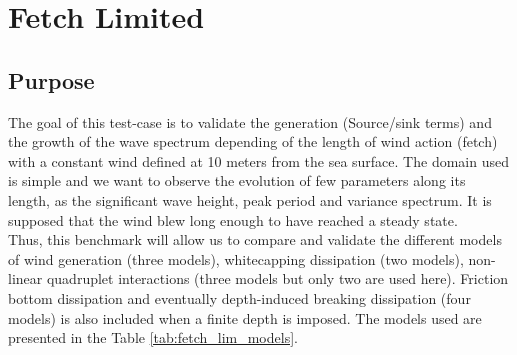 \chapter{Fetch Limited }

\section{Purpose}
The goal of this test-case is to validate the generation (Source/sink terms)  and the growth of the wave spectrum depending of the length of wind action (fetch) with a constant wind defined at 10 meters from the sea surface. The domain used is simple and we want to observe the evolution of few parameters along its length, as the significant wave height, peak period and variance spectrum.
It is supposed that the wind blew long enough to have reached a steady state.\\
Thus, this benchmark will allow us to compare and validate the different models of wind generation (three models), whitecapping dissipation (two models), non-linear quadruplet interactions (three models but only two are used here). Friction bottom dissipation and eventually depth-induced breaking dissipation (four models) is also included when a finite depth is imposed. The models used are presented in the Table \ref{tab:fetch_lim_models}.

